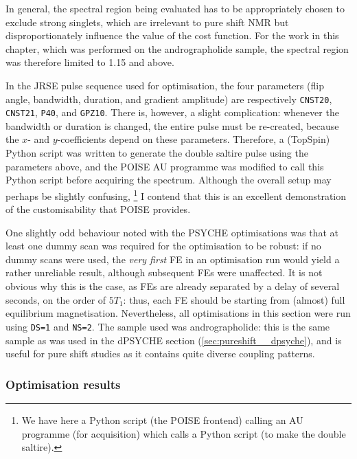 In general, the spectral region being evaluated has to be appropriately chosen to exclude strong singlets, which are irrelevant to pure shift NMR but disproportionately influence the value of the cost function.
For the work in this chapter, which was performed on the andrographolide sample, the spectral region was therefore limited to \qty{1.15}{\ppm} and above.

In the JRSE pulse sequence used for optimisation, the four parameters (flip angle, bandwidth, duration, and gradient amplitude) are respectively \texttt{CNST20}, \texttt{CNST21}, \texttt{P40}, and \texttt{GPZ10}.
There is, however, a slight complication: whenever the bandwidth or duration is changed, the entire pulse must be re-created, because the $x$- and $y$-coefficients depend on these parameters.
Therefore, a (TopSpin) Python script was written to generate the double saltire pulse using the parameters above, and the POISE AU programme was modified to call this Python script before acquiring the spectrum.
Although the overall setup may perhaps be slightly confusing,%
\footnote{We have here a Python script (the POISE frontend) calling an AU programme (for acquisition) which calls a Python script (to make the double saltire).}
I contend that this is an excellent demonstration of the customisability that POISE provides.

One slightly odd behaviour noted with the PSYCHE optimisations was that at least one dummy scan was required for the optimisation to be robust:
if no dummy scans were used, the \textit{very first} FE in an optimisation run would yield a rather unreliable result, although subsequent FEs were unaffected.
It is not obvious why this is the case, as FEs are already separated by a delay of several seconds, on the order of $5T_1$: thus, each FE should be starting from (almost) full equilibrium magnetisation.
Nevertheless, all optimisations in this section were run using \texttt{DS=1} and \texttt{NS=2}.
The sample used was andrographolide: this is the same sample as was used in the dPSYCHE section (\cref{sec:pureshift__dpsyche}), and is useful for pure shift studies as it contains quite diverse coupling patterns.

\subsubsection{Optimisation results}

